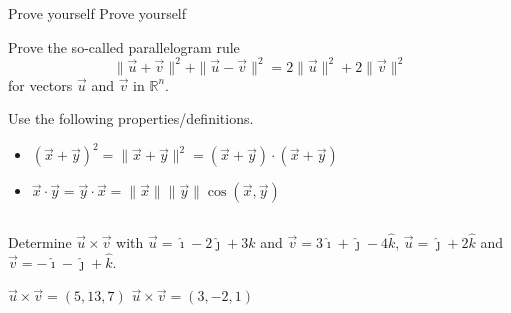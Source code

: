 \begin{Answer}\phantom{}
    \begin{multicols}{2}
	
	\Question Prove  yourself
	\Question Prove  yourself
	\EndCurrentQuestion
	\end{multicols}
\end{Answer}


\begin{Exercise}[difficulty=1]  Prove the so-called  parallelogram rule
\[ \| \vec{u} + \vec{v} \|^2 + \| \vec{u} - \vec{v} \|^2 = 2\| \vec{u} \|^2 + 2 \| \vec{v} \|^2  \]
for vectors $\vec{u}$ and $\vec{v}$ in $\mathbb{R}^n$.

\end{Exercise}

\begin{Answer}\phantom{}
    Use the following properties/definitions.
	\begin{itemize}
	    \item $(\vec{x}+\vec{y})^2 = \|\vec{x}+\vec{y}\|^2 = (\vec{x}+\vec{y}) \cdot (\vec{x}+\vec{y})$
	    \item $\vec x \cdot \vec y = \vec y \cdot \vec x = \|\vec x  \| \| \vec y \| \cos(\vec x, \vec y)$
	\end{itemize}
\end{Answer}

\fi


\subsection*{}
\begin{Exercise} Determine $\vec{u} \times \vec{v} $ with 
	\Question[difficulty = 1] $\vec{u} = \hat{\imath}-2\hat{\jmath}+3\hat{k}$ \quad and \quad $\vec{v} = 3\hat{\imath}+\hat{\jmath}-4\hat{k}$,
	\Question[difficulty = 1] $\vec{u} = \hat{\jmath}+2\hat{k}$ \quad and \quad $\vec{v} = -\hat{\imath}-\hat{\jmath}+\hat{k}$.

\end{Exercise}

\begin{Answer}\phantom{}
    \begin{multicols}{2}
	
	\Question $\vec{u} \times \vec{v} = (5,13,7)$
	\Question $\vec{u} \times \vec{v} = (3,-2,1)$
	\EndCurrentQuestion
	\end{multicols}
\end{Answer}

